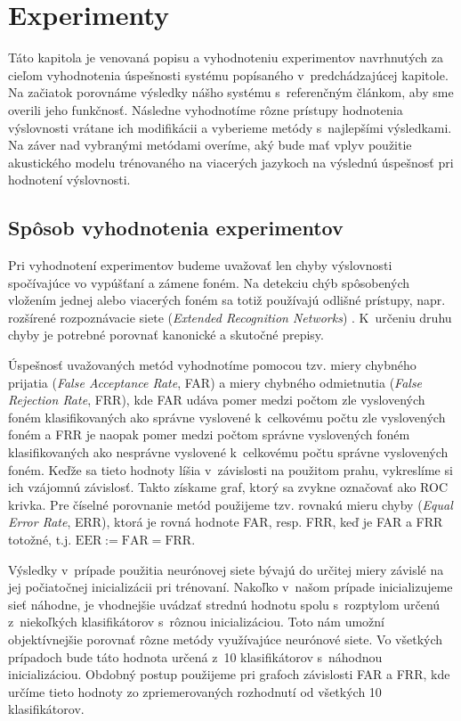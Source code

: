 \chapter{Experimenty} \label{cha:experiments}

Táto kapitola je venovaná popisu a vyhodnoteniu experimentov navrhnutých za cieľom vyhodnotenia úspešnosti systému popísaného v~predchádzajúcej kapitole. Na začiatok porovnáme výsledky nášho systému s~referenčným článkom, aby sme overili jeho funkčnosť. Následne vyhodnotíme rôzne prístupy hodnotenia výslovnosti vrátane ich modifikácii a vyberieme metódy s~najlepšími výsledkami. Na záver nad vybranými metódami overíme, aký bude mať vplyv použitie akustického modelu trénovaného na viacerých jazykoch na výslednú úspešnosť pri hodnotení výslovnosti.

\section{Spôsob vyhodnotenia experimentov} \label{sec:vyhodnotenie-experimentov}

Pri vyhodnotení experimentov budeme uvažovať len chyby výslovnosti spočívajúce vo vypúšťaní a zámene foném. Na detekciu chýb spôsobených vložením jednej alebo viacerých foném sa totiž používajú odlišné prístupy, napr. rozšírené rozpoznávacie siete (\textit{Extended Recognition Networks}) \cite{Arora2018}. K~určeniu druhu chyby je potrebné porovnať kanonické a skutočné prepisy. 

Úspešnosť uvažovaných metód vyhodnotíme pomocou tzv. miery chybného prijatia (\textit{False Acceptance Rate}, FAR) a miery chybného odmietnutia (\textit{False Rejection Rate}, FRR), kde FAR udáva pomer medzi počtom zle vyslovených foném klasifikovaných ako správne vyslovené k~celkovému počtu zle vyslovených foném a FRR je naopak pomer medzi počtom správne vyslovených foném klasifikovaných ako nesprávne vyslovené k~celkovému počtu správne vyslovených foném. Keďže sa tieto hodnoty líšia v~závislosti na použitom prahu, vykreslíme si ich vzájomnú závislosť. Takto získame graf, ktorý sa zvykne označovať ako ROC krivka. Pre číselné porovnanie metód použijeme tzv. rovnakú mieru chyby (\textit{Equal Error Rate}, ERR), ktorá je rovná hodnote FAR, resp. FRR, keď je FAR a FRR totožné, t.j. $\text{EER} := \text{FAR} = \text{FRR}$.

Výsledky v~prípade použitia neurónovej siete bývajú do určitej miery závislé na jej počiatočnej inicializácii pri trénovaní. Nakoľko v~našom prípade inicializujeme sieť náhodne, je vhodnejšie uvádzať strednú hodnotu spolu s~rozptylom určenú z~niekoľkých klasifikátorov s~rôznou inicializáciou. Toto nám umožní objektívnejšie porovnať rôzne metódy využívajúce neurónové siete. Vo všetkých prípadoch bude táto hodnota určená z~10 klasifikátorov s~náhodnou inicializáciou. Obdobný postup použijeme pri grafoch závislosti FAR a FRR, kde určíme tieto hodnoty zo zpriemerovaných rozhodnutí od všetkých 10 klasifikátorov.

